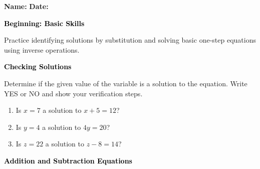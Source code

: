 \documentclass[12pt, letterpaper, fleqn]{article}
\begin{document}
\textbf{Name:} \underline{\hspace{5cm}}
\hfill
\textbf{Date:} \underline{\hspace{3cm}}\\

\begin{tcolorbox}[colback=black!10]
    \large\textcolor{black}{\textbf{Beginning: Basic Skills}}
\end{tcolorbox}

\vspace{3mm}
\noindent
Practice identifying solutions by substitution and solving basic one-step equations using inverse operations.

\vspace{4mm}

\begin{tcolorbox}[colback=black!10]
\large\textcolor{black}{\textbf{Checking Solutions}}
\end{tcolorbox}

\noindent
Determine if the given value of the variable is a solution to the equation. Write YES or NO and show your verification steps.

\vspace{3mm}

\begin{enumerate}[itemsep=2.2cm, leftmargin=0.6cm]

\item Is $x = 7$ a solution to $x + 5 = 12$?

\vspace{2cm}

\item Is $y = 4$ a solution to $4y = 20$?

\vspace{2cm}

\item Is $z = 22$ a solution to $z - 8 = 14$?

\vspace{2cm}

\end{enumerate}

\newpage

\begin{tcolorbox}[colback=black!10]
\large\textcolor{black}{\textbf{Addition and Subtraction Equations}}
\end{tcolorbox}
\end{document}
